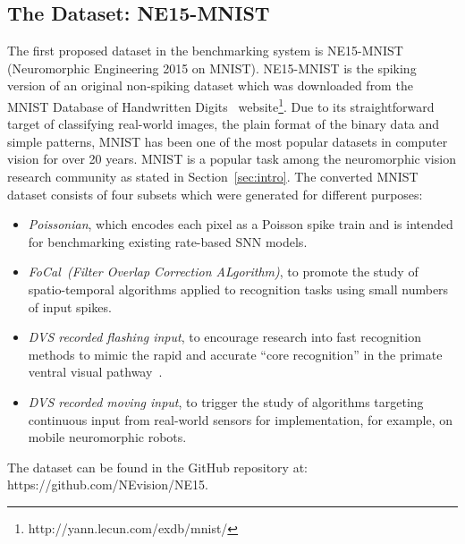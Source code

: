 \subsection{The Dataset: NE15-MNIST}
\label{sec:data}
The first proposed dataset in the benchmarking system is NE15-MNIST (Neuromorphic Engineering 2015 on MNIST).
NE15-MNIST is the spiking version of an original non-spiking dataset which was downloaded from the MNIST Database of Handwritten Digits~\cite{lecun1998gradient}  website\footnote{http://yann.lecun.com/exdb/mnist/}.
Due to its straightforward target of classifying real-world images, the plain format of the binary data and simple patterns, MNIST has been one of the most popular datasets in computer vision for over 20 years.
MNIST is a popular task among the neuromorphic vision research community as stated in Section~\ref{sec:intro}.
The converted MNIST dataset consists of four subsets which were generated for different purposes:
\begin{itemize}
	\item \textit{Poissonian},
	which encodes each pixel as a Poisson spike train and is intended for benchmarking existing rate-based SNN models.
	\item \textit{FoCal~(Filter Overlap Correction ALgorithm)},
	to promote the study of spatio-temporal algorithms applied to recognition tasks using small numbers of input spikes.
	\item \textit{DVS recorded flashing input},
	to encourage research into fast recognition methods to mimic the rapid and accurate ``core recognition'' in the primate ventral visual pathway~\cite{dicarlo2012does}.
	\item \textit{DVS recorded moving input},
	to trigger the study of algorithms targeting continuous input from real-world sensors for implementation, for example, on mobile neuromorphic robots.
\end{itemize}
The dataset can be found in the GitHub repository at: https://github.com/NEvision/NE15.
